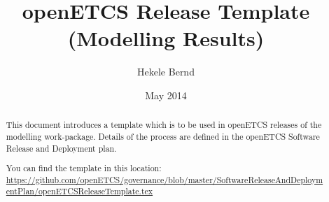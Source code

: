 \documentclass{template/openetcs_article}
\begin{document}
\frontmatter
{}







\title{openETCS Release Template (Modelling Results)}


\date{May 2014}


\author{Hekele Bernd}





\begin{abstract}
This document introduces a template which is to be used in openETCS releases of the modelling work-package. Details of the process are defined in the openETCS Software Release and Deployment plan.

You can find the template in this location: \url{https://github.com/openETCS/governance/blob/master/SoftwareReleaseAndDeploymentPlan/openETCSReleaseTemplate.tex} 
 
\end{abstract}

\maketitle

\end{document}
